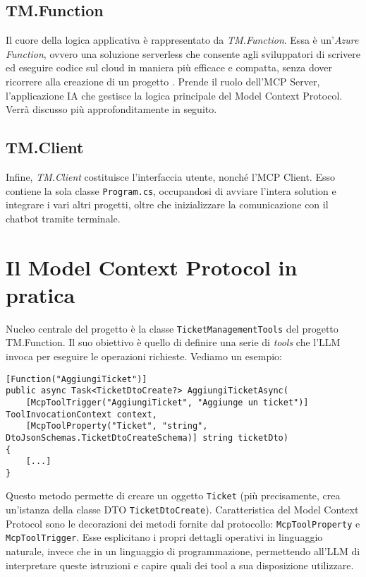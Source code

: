 \subsection{TM.Function}
Il cuore della logica applicativa è rappresentato da \textit{TM.Function}. Essa è un'\textit{Azure Function}, ovvero una soluzione serverless
che consente agli sviluppatori di scrivere ed eseguire codice sul cloud in maniera più efficace e compatta, senza dover ricorrere alla
creazione di un progetto \cite{azurefunctions_msdocs}. Prende il ruolo dell'MCP Server, l'applicazione IA che gestisce la logica principale del
Model Context Protocol. Verrà discusso più approfonditamente in seguito.

\subsection{TM.Client}
Infine, \textit{TM.Client} costituisce l'interfaccia utente, nonché l'MCP Client. Esso contiene la sola classe \texttt{Program.cs}, occupandosi
di avviare l'intera solution e integrare i vari altri progetti, oltre che inizializzare la comunicazione con il chatbot tramite terminale.

\newpage
\section{Il Model Context Protocol in pratica}
Nucleo centrale del progetto è la classe \texttt{TicketManagementTools} del progetto TM.Function. Il suo obiettivo è quello di definire una serie
di \textit{tools} che l'LLM invoca per eseguire le operazioni richieste. Vediamo un esempio:

\begin{scriptsize}
\begin{verbatim}
[Function("AggiungiTicket")]
public async Task<TicketDtoCreate?> AggiungiTicketAsync(
    [McpToolTrigger("AggiungiTicket", "Aggiunge un ticket")] ToolInvocationContext context,
    [McpToolProperty("Ticket", "string", DtoJsonSchemas.TicketDtoCreateSchema)] string ticketDto)
{
    [...]
}
\end{verbatim}
\end{scriptsize}

Questo metodo permette di creare un oggetto \texttt{Ticket} (più precisamente, crea un'istanza della classe DTO \texttt{TicketDtoCreate}).
Caratteristica del Model Context Protocol sono le decorazioni dei metodi fornite dal protocollo: \texttt{McpToolProperty} e \texttt{McpToolTrigger}. 
Esse esplicitano i propri dettagli operativi in linguaggio naturale, invece che in un linguaggio di programmazione, permettendo all'LLM di interpretare 
queste istruzioni e capire quali dei tool a sua disposizione utilizzare.

